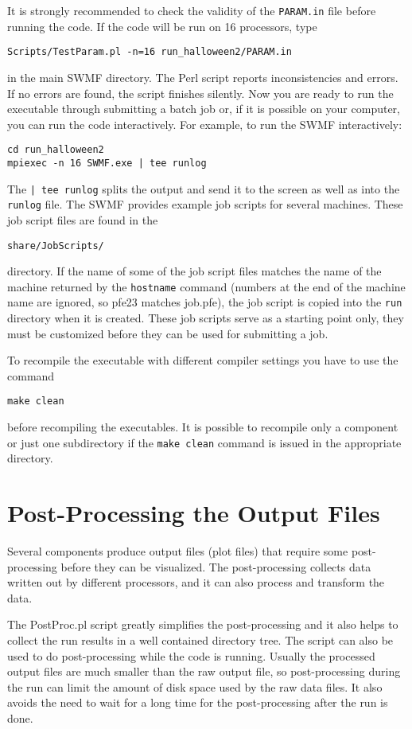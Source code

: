 It is strongly recommended to check the validity of the {\tt PARAM.in} 
file before running the code. If the code will be run on 16 processors, type
\begin{verbatim}
Scripts/TestParam.pl -n=16 run_halloween2/PARAM.in
\end{verbatim}
in the main SWMF directory.
The Perl script reports inconsistencies and errors. 
If no errors are found, the script finishes silently.
Now you are ready to run the executable through submitting a batch job or, 
if it is possible on your computer, you can run the code interactively.  For
example, to run the SWMF interactively:
\begin{verbatim}
cd run_halloween2
mpiexec -n 16 SWMF.exe | tee runlog
\end{verbatim}
The {\tt | tee runlog} splits the output and send it to the screen
as well as into the {\tt runlog} file.
The SWMF provides example job scripts for several machines. 
These job script files are found in the
\begin{verbatim}
share/JobScripts/
\end{verbatim}
directory. If the name of some of the job script files matches the
name of the machine returned by the {\tt hostname} command (numbers
at the end of the machine name are ignored, so pfe23 matches job.pfe), 
the job script is copied into the {\tt run} directory when it is created.
These job scripts serve as a starting point only, they must
be customized before they can be used for submitting a job.

To recompile the executable with different compiler settings you have
to use the command
\begin{verbatim}
make clean
\end{verbatim}
before recompiling the executables. It is possible to recompile
only a component or just one subdirectory if the {\tt make clean}
command is issued in the appropriate directory.

\section{Post-Processing the Output Files}

Several components produce output files (plot files) that require
some post-processing before they can be visualized. The post-processing
collects data written out by different processors, and it can also
process and transform the data. 

The PostProc.pl script greatly simplifies the post-processing and
it also helps to collect the run results in a well contained directory tree.
The script can also be used to do post-processing while the code is running.
Usually the processed output files are much smaller than the raw output file,
so post-processing during the run can limit the amount of disk space used
by the raw data files. It also avoids the need to wait for a long time 
for the post-processing after the run is done. 

